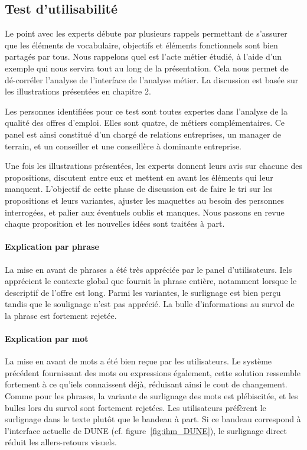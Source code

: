 \subsection{Test d'utilisabilité}\label{C3:discussion}

Le point avec les experts débute par plusieurs rappels permettant de s'assurer que les éléments de vocabulaire, objectifs et éléments fonctionnels sont bien partagés par tous. Nous rappelons quel est l'acte métier étudié, à l'aide d'un exemple qui nous servira tout au long de la présentation. Cela nous permet de dé-corréler l'analyse de l'interface de l'analyse métier. La discussion est basée sur les illustrations présentées en chapitre 2.

Les personnes identifiées pour ce test sont toutes expertes dans l'analyse de la qualité des offres d'emploi. Elles sont quatre, de métiers complémentaires. Ce panel est ainsi constitué d'un chargé de relations entreprises, un manager de terrain, et un conseiller et une conseillère à dominante entreprise.

Une fois les illustrations présentées, les experts donnent leurs avis sur chacune des propositions, discutent entre eux et mettent en avant les éléments qui leur manquent.
L'objectif de cette phase de discussion est de faire le tri sur les propositions et leurs variantes, ajuster les maquettes au besoin des personnes interrogées, et palier aux éventuels oublis et manques.
Nous passons en revue chaque proposition et les nouvelles idées sont traitées à part.

\paragraph{Explication par phrase} La mise en avant de phrases a été très appréciée par le panel d'utilisateurs. Iels apprécient le contexte global que fournit la phrase entière, notamment lorsque le descriptif de l'offre est long.
Parmi les variantes, le surlignage est bien perçu tandis que le soulignage n'est pas apprécié. La bulle d'informations au survol de la phrase est fortement rejetée.

\paragraph{Explication par mot} La mise en avant de mots a été bien reçue par les utilisateurs. Le système précédent fournissant des mots ou expressions également, cette solution ressemble fortement à ce qu'iels connaissent déjà, réduisant ainsi le cout de changement. Comme pour les phrases, la variante de surlignage des mots est plébiscitée, et les bulles lors du survol sont fortement rejetées. Les utilisateurs préfèrent le surlignage dans le texte plutôt que le bandeau à part. Si ce bandeau correspond à l'interface actuelle de DUNE (cf. figure~\ref{fig:ihm_DUNE}), le surlignage direct réduit les allers-retours visuels.

